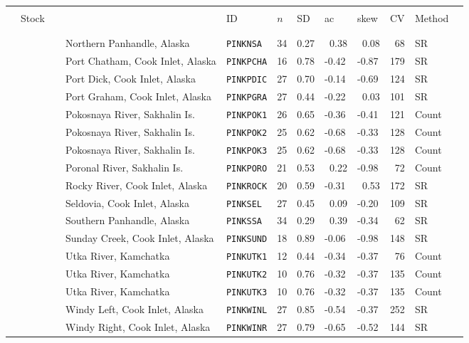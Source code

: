 \newpage
\begin{flushleft}
\begin{tabular*}{7.1in}{llllllllll} 
\hline \\ 
&{\normalsize Stock}&{\normalsize ID}&{\normalsize $n$}&{\normalsize SD}&{\normalsize ac}&{\normalsize skew}&{\normalsize CV}&{\normalsize Method}  & \\ 
 &&&&&&&&&\\ 
  \hline  &&&&&&&&&\\ 
&~~~~~~~~~Northern Panhandle, Alaska&{\tt PINKNSA}&34&0.27&~0.38&~0.08&~68&SR  & \\ 
&~~~~~~~~~Port Chatham, Cook Inlet, Alaska&{\tt PINKPCHA}&16&0.78&-0.42&-0.87&179&SR  & \\ 
&~~~~~~~~~Port Dick, Cook Inlet, Alaska&{\tt PINKPDIC}&27&0.70&-0.14&-0.69&124&SR  & \\ 
&~~~~~~~~~Port Graham, Cook Inlet, Alaska&{\tt PINKPGRA}&27&0.44&-0.22&~0.03&101&SR  & \\ 
&~~~~~~~~~Pokosnaya River, Sakhalin Is.&{\tt PINKPOK1}&26&0.65&-0.36&-0.41&121&Count  & \\ 
&~~~~~~~~~Pokosnaya River, Sakhalin Is.&{\tt PINKPOK2}&25&0.62&-0.68&-0.33&128&Count  & \\ 
&~~~~~~~~~Pokosnaya River, Sakhalin Is.&{\tt PINKPOK3}&25&0.62&-0.68&-0.33&128&Count  & \\ 
&~~~~~~~~~Poronal River, Sakhalin Is.&{\tt PINKPORO}&21&0.53&~0.22&-0.98&~72&Count  & \\ 
&~~~~~~~~~Rocky River, Cook Inlet, Alaska&{\tt PINKROCK}&20&0.59&-0.31&~0.53&172&SR  & \\ 
&~~~~~~~~~Seldovia, Cook Inlet, Alaska&{\tt PINKSEL}&27&0.45&~0.09&-0.20&109&SR  & \\ 
&~~~~~~~~~Southern Panhandle, Alaska&{\tt PINKSSA}&34&0.29&~0.39&-0.34&~62&SR  & \\ 
&~~~~~~~~~Sunday Creek, Cook Inlet, Alaska&{\tt PINKSUND}&18&0.89&-0.06&-0.98&148&SR  & \\ 
&~~~~~~~~~Utka River, Kamchatka&{\tt PINKUTK1}&12&0.44&-0.34&-0.37&~76&Count  & \\ 
&~~~~~~~~~Utka River, Kamchatka&{\tt PINKUTK2}&10&0.76&-0.32&-0.37&135&Count  & \\ 
&~~~~~~~~~Utka River, Kamchatka&{\tt PINKUTK3}&10&0.76&-0.32&-0.37&135&Count  & \\ 
&~~~~~~~~~Windy Left, Cook Inlet, Alaska&{\tt PINKWINL}&27&0.85&-0.54&-0.37&252&SR  & \\ 
&~~~~~~~~~Windy Right, Cook Inlet, Alaska&{\tt PINKWINR}&27&0.79&-0.65&-0.52&144&SR  & \\ 

\end{tabular*}
\end{flushleft}
